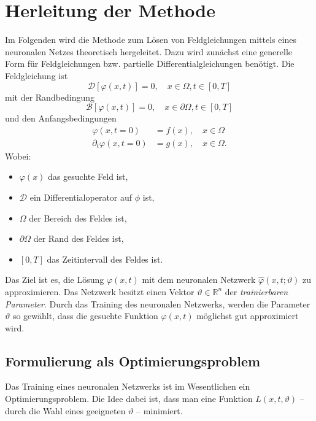 %
%
%
%

\section{Herleitung der Methode\label{neuronal:section:herleitung}}

Im Folgenden wird die Methode zum Lösen von Feldgleichungen mittels eines neuronalen Netzes theoretisch hergeleitet.
Dazu wird zunächst eine generelle Form für Feldgleichungen bzw. partielle Differentialgleichungen benötigt.
Die Feldgleichung ist
\begin{equation}
\mathcal{D}[\varphi(x, t)] = 0, \quad x \in \Omega, t \in [0,T]
\end{equation}
mit der Randbedingung
\begin{equation}
\mathcal{B}[\varphi(x, t)] = 0, \quad x \in \partial \Omega, t \in [0,T]
\end{equation}
und den Anfangsbedingungen
\begin{equation}
    \begin{aligned}
        \varphi(x, t = 0) &= f(x), \quad x \in \Omega \\
        \partial_t \varphi(x, t = 0) &= g(x), \quad x \in \Omega.
    \end{aligned}
\end{equation}
Wobei:
\begin{itemize}
    \item $\varphi(x)$ das gesuchte Feld ist,
    \item $\mathcal{D}$ ein Differentialoperator auf $\phi$ ist,
    \item $\Omega$ der Bereich des Feldes ist,
    \item $\partial \Omega$ der Rand des Feldes ist,
    \item $[0,T]$ das Zeitintervall des Feldes ist.
\end{itemize}
Das Ziel ist es, die Lösung $\varphi(x, t)$ mit dem neuronalen Netzwerk $\hat{\varphi}(x, t; \vartheta)$ zu approximieren.
Das Netzwerk besitzt einen Vektor \( \vartheta \in \mathbb{R}^n \) der \emph{trainierbaren Parameter}.
Durch das Training des neuronalen Netzwerks, werden die Parameter $\vartheta$ so gewählt, dass die gesuchte Funktion $\varphi(x, t)$ möglichst gut approximiert wird.

\subsection{Formulierung als Optimierungsproblem}\label{neuronal:subsection:optimierungsproblem}
Das Training eines neuronalen Netzwerks ist im Wesentlichen ein Optimierungsproblem.
Die Idee dabei ist, dass man eine Funktion \( L(x, t, \vartheta) \) -- durch die Wahl eines geeigneten \( \vartheta \) -- minimiert.

